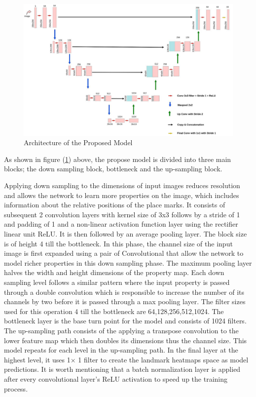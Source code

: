 \documentclass{elektr}
\begin{document}
\begin{figure}[H]
	\begin{center}
		\includegraphics[width=6.3in]{./media/image2}
		\caption{Architecture of the Proposed Model}
		\label{fig2}
	\end{center}\vs{-4mm}
\end{figure}




As shown in figure (\ref{fig2}) above, the propose model is divided into three main blocks; the down sampling block, bottleneck and the up-sampling block.

Applying down sampling to the dimensions of input images reduces resolution and allows the network to learn more properties on the image, which includes information about the relative positions of the place marks. It consists of subsequent 2 convolution layers with kernel size of 3x3 follows by a stride of 1 and padding of 1 and a non-linear activation function layer using the rectifier linear unit ReLU. It is then followed by an average pooling layer. The block size is of height 4 till the bottleneck. In this phase, the channel size of the input image is first expanded using a pair of Convolutional that allow the network to model richer properties in this down sampling phase. The maximum pooling layer halves the width and height dimensions of the property map. Each down sampling level follows a similar pattern where the input property is passed through a double convolution which is responsible to increase the number of its channels by two before it is passed through a max pooling layer. The filter sizes used for this operation 4 till the bottleneck are 64,128,256,512,1024. The bottleneck layer is the base turn point for the model and consists of 1024 filters. The up-sampling path consists of the applying a transpose convolution to the lower feature map which then doubles its dimensions thus the channel size. This model repeats for each level in the up-sampling path. In the final layer at the highest level, it uses 1$ \times $ 1 filter to create the landmark heatmaps space as model predictions. It is worth mentioning that a batch normalization layer is applied after every convolutional layer’s ReLU activation to speed up the training process. 
\end{document}
